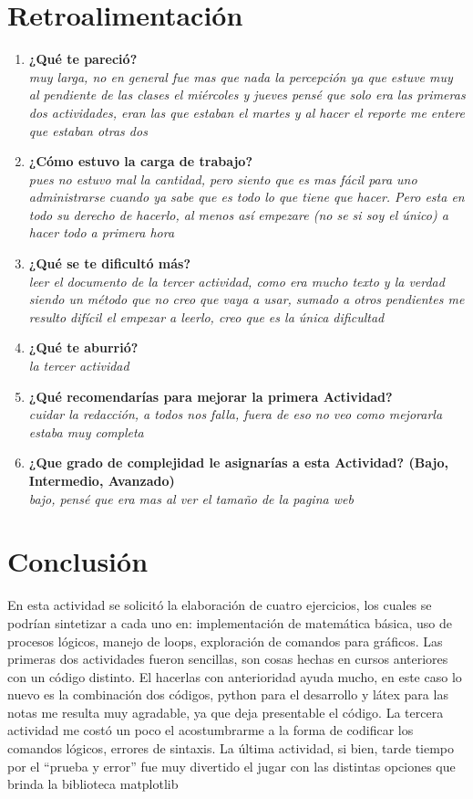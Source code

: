 \documentclass{report}
\begin{document}
\section{Retroalimentación}
\begin{enumerate}
\item \textbf{¿Qué te pareció?}\\
\textit{muy larga, no en general fue mas que nada la percepción ya que estuve muy al pendiente de las clases el miércoles y jueves pensé que solo era las primeras dos actividades, eran las que estaban el martes y al hacer el reporte me entere que estaban otras dos}
\item \textbf{¿Cómo estuvo la carga de trabajo?}\\
\textit{pues no estuvo mal la cantidad, pero siento que es mas fácil para uno administrarse  cuando ya sabe que es todo lo que tiene que hacer. Pero esta en todo su derecho de hacerlo, al menos así empezare (no se si soy el único) a  hacer todo a primera hora}
\item \textbf{¿Qué se te dificultó más?} \\
\textit{leer el documento de la tercer actividad, como era mucho texto y la verdad siendo un método que no creo que vaya a usar, sumado a otros pendientes me resulto difícil el empezar a leerlo, creo que es la única dificultad}
\item \textbf{¿Qué te aburrió?}\\
\textit{la tercer actividad}
\item \textbf{¿Qué recomendarías para mejorar la primera Actividad?}\\
\textit{cuidar la redacción, a todos nos falla, fuera de eso no veo como mejorarla estaba muy completa}
\item \textbf{¿Que grado de complejidad le asignarías a esta Actividad? (Bajo, Intermedio, Avanzado)} \\
\textit{bajo, pensé que era mas al ver el tamaño de la pagina web}

\end{enumerate}

\section{Conclusión}
En esta actividad se solicitó la elaboración de cuatro ejercicios, los cuales se podrían sintetizar a cada uno en: implementación de matemática básica, uso de procesos lógicos, manejo de loops, exploración de comandos para gráficos. Las primeras dos actividades fueron sencillas, son cosas hechas en cursos anteriores con un código distinto. El hacerlas con anterioridad ayuda mucho, en este caso lo nuevo es la combinación dos códigos, python para el desarrollo y látex para las notas me resulta muy agradable, ya que deja presentable el código. La tercera actividad me costó un poco el acostumbrarme a la forma de codificar los comandos lógicos, errores de sintaxis. La última actividad, si bien, tarde tiempo por el “prueba y error” fue muy divertido el jugar con las distintas opciones que brinda la biblioteca matplotlib
\end{document}
